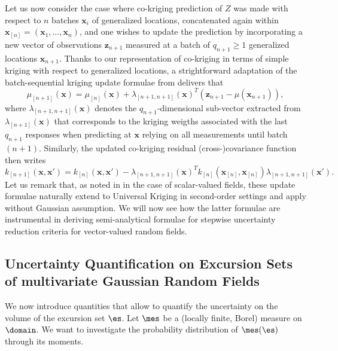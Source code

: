 Let us now consider the case where co-kriging prediction of $Z$ was made with respect to $n$ batches $\bm{x}_i$ of generalized locations, concatenated again within
$\bm{x}_{[n]}=(\bm{x}_1,\dots, \bm{x}_n)$, and one wishes to update the prediction by incorporating a new vector of observations $\mathbf{z}_{n+1}$ measured at a batch of $q_{n+1} \geq 1$ generalized locations $\bm{x}_{n+1}$.
Thanks to our representation of co-kriging in terms of simple kriging with respect to generalized locations, a strightforward adaptation of the batch-sequential kriging update formulae from \cite{Chevalier.etal2013a} delivers that
% 
\begin{equation}
\mu_{[n+1]}(\bm{x})=\mu_{[n]}(\bm{x})+\lambda_{[n+1,n+1]}(\bm{x})^T (\mathbf{z}_{n+1}-\mu(\bm{x}_{n+1})),
\end{equation}
where $\lambda_{[n+1,n+1]}(\bm{x})$ denotes the $q_{n+1}$-dimensional sub-vector extracted from
$\lambda_{[n+1]}(\bm{x})$ that corresponds to the kriging weigths associated with the last $q_{n+1}$ responses when 
predicting at $\bm{x}$ relying on all measurements until batch $(n+1)$.
Similarly, the updated co-kriging residual (cross-)covariance function then writes
\begin{equation}
k_{[n+1]}(\bm{x},\bm{x}')=k_{[n]}(\bm{x},\bm{x}')-\lambda_{[n+1,n+1]}(\bm{x})^T k_{[n]}(\bm{x}_{[n]}, \bm{x}_{[n]}) \lambda_{{[n+1,n+1]}}(\bm{x}').
\end{equation}
%
Let us remark that, as noted in \cite{Chevalier2015} in the case of scalar-valued fields, these update formulae naturally 
extend to Universal Kriging in second-order settings and apply without Gaussian assumption. We will now see how the latter formulae are instrumental in deriving semi-analytical formulae for stepwise uncertainty reduction criteria for 
vector-valued random fields.






\subsection{Uncertainty Quantification on Excursion Sets of multivariate Gaussian Random Fields}
\label{sec:set_uq}
We now introduce quantities that allow to quantify the uncertainty on the volume of the excursion set $\es$. Let $\mes$ be a 
(locally finite, Borel) measure  on $\domain$. We want to investigate the probability distribution 
of $\mes(\es)$ through its moments.

